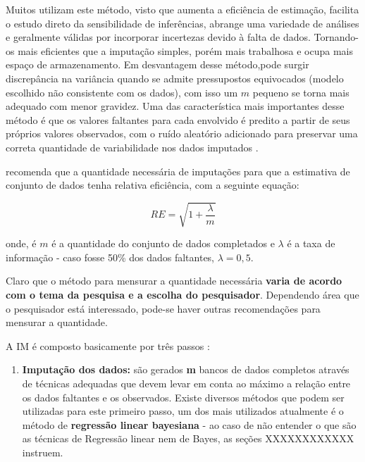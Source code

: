 \documentclass[
  openany]{book}
\providecommand{\tightlist}{%
  \setlength{\itemsep}{0pt}\setlength{\parskip}{0pt}}
\begin{document}
Muitos utilizam este método, visto que aumenta a eficiência de estimação, facilita o estudo direto da sensibilidade de inferências, abrange uma variedade de análises e geralmente válidas por incorporar incertezas devido à falta de dados. Tornando-os mais eficientes que a imputação simples, porém mais trabalhosa e ocupa mais espaço de armazenamento. Em desvantagem desse método,pode surgir discrepância na variância quando se admite pressupostos equivocados (modelo escolhido não consistente com os dados), com isso um \(m\) pequeno se torna mais adequado com menor gravidez. Uma das característica mais importantes desse método é que os valores faltantes para cada envolvido é predito a partir de seus próprios valores observados, com o ruído aleatório adicionado para preservar uma correta quantidade de variabilidade nos dados imputados \citep{schafer2002missing}.

\citet{schafer1999multiple} recomenda que a quantidade necessária de imputações para que a estimativa de conjunto de dados tenha relativa eficiência, com a seguinte equação:

\begin{equation} 
  RE=\sqrt{1+\frac{\lambda}{m}}
  \label{eq:qimputm}
\end{equation}

onde, é \(m\) é a quantidade do conjunto de dados completados e \(\lambda\) é a taxa de informação - caso fosse 50\% dos dados faltantes, \(\lambda=0,5\).

Claro que o método para mensurar a quantidade necessária \textbf{varia de acordo com o tema da pesquisa e a escolha do pesquisador}. Dependendo área que o pesquisador está interessado, pode-se haver outras recomendações para mensurar a quantidade.

A IM é composto basicamente por três passos \citep{assunccao2012estrategias}:

\begin{enumerate}
\def\labelenumi{\arabic{enumi}.}
\tightlist
\item
  \textbf{Imputação dos dados:} são gerados \textbf{m} bancos de dados completos através de técnicas adequadas que devem levar em conta ao máximo a relação entre os dados faltantes e os observados. Existe diversos métodos que podem ser utilizadas para este primeiro passo, um dos mais utilizados atualmente é o método de \textbf{regressão linear bayesiana} - ao caso de não entender o que são as técnicas de Regressão linear nem de Bayes, as seções XXXXXXXXXXXX instruem.
\end{enumerate}
\end{document}
